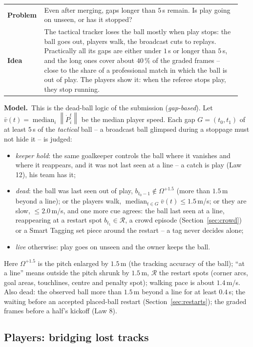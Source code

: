 \documentclass[11pt,a4paper]{article}
\makeatletter
\newcommand{\triple}[3]{%
  \par\medskip\noindent
  \begin{tabular}{@{}p{0.13\linewidth}@{\hspace{0.6em}}p{0.82\linewidth}@{}}
  \textbf{Problem} & #1\\[0.3em]
  \textbf{Idea}    & #2
  \end{tabular}\par\smallskip\noindent
  \textbf{Model.}\ #3\par\medskip}
\newcommand{\norm}[1]{\left\lVert #1 \right\rVert}
\makeatother
\begin{document}
\triple{Even after merging, gaps longer than $5$\,s remain. Is play going on unseen, or has it
stopped?}
{The tactical tracker loses the ball mostly when play stops: the ball goes out, players walk,
the broadcast cuts to replays. Practically all its gaps are either under $1$\,s or longer than
$5$\,s, and the long ones cover about $40\,\%$ of the graded frames -- close to the share of a
professional match in which the ball is out of play. The players show it: when the referee
stops play, they stop running.}
{This is the dead-ball logic of the submission (\emph{gap-based}). Let
$\bar v(t)=\operatorname{median}_i\norm{\dot P_i^t}$ be the median player speed. Each gap
$G=(t_0,t_1)$ of at least $5$\,s of the \emph{tactical} ball -- a broadcast ball glimpsed during
a stoppage must not hide it -- is judged:
\begin{itemize}[leftmargin=1.2em]
\item \emph{keeper hold}: the same goalkeeper controls the ball where it vanishes and where it
  reappears, and it was not last seen at a line -- a catch is play (Law 12), his team has it;
\item \emph{dead}: the ball was last seen out of play, $b_{t_0-1}\notin\Omega^{+1.5}$ (more than $1.5$\,m beyond a line); or
  the players walk, $\operatorname{median}_{t\in G}\bar v(t)\le 1.5$\,m/s; or they are slow,
  $\le 2.0$\,m/s, and one more cue agrees: the ball last seen at a line, reappearing at a restart
  spot $b_{t_1}\in\mathcal R$, a crowd episode (Section~\ref{sec:crowd}) or a Smart Tagging set
  piece around the restart -- a tag never decides alone;
\item \emph{live} otherwise: play goes on unseen and the owner keeps the ball.
\end{itemize}
Here $\Omega^{+1.5}$ is the pitch enlarged by $1.5$\,m (the tracking accuracy of the ball); ``at a
line'' means outside the pitch shrunk by $1.5$\,m, $\mathcal R$ the
restart spots (corner arcs, goal areas, touchlines, centre and penalty spot); walking pace is
about $1.4$\,m/s. Also dead: the observed ball more than $1.5$\,m beyond a line for at least
$0.4$\,s; the waiting before an accepted placed-ball restart (Section~\ref{sec:restarts}); the
graded frames before a half's kickoff (Law 8).}

\subsection{Players: bridging lost tracks}\label{sec:players}
\end{document}

